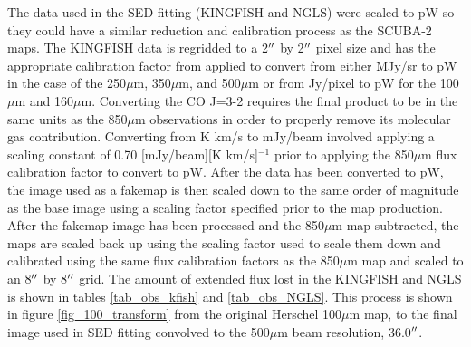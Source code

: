 The data used in the SED fitting (KINGFISH and NGLS) were scaled to pW so they could have a similar reduction and calibration process as the SCUBA-2 maps.   The KINGFISH data is regridded to a 2$\mbox{$^{\prime\prime}$}$ by 2$\mbox{$^{\prime\prime}$}$ pixel size and has the appropriate calibration factor from \cite{dempsey2013} applied to convert from either MJy/sr to pW in the case of the 250$\mu$m, 350$\mu$m, and 500$\mu$m or from Jy/pixel to pW for the 100$\mu$m and 160$\mu$m.  Converting the CO J=3-2 requires the final product to be in the same units as the 850$\mu$m observations in order to properly remove its molecular gas contribution.  Converting from K km/s to mJy/beam involved applying a scaling constant of 0.70 [mJy/beam][K km/s]$^{-1}$ \citep{drabek2012} prior to applying the 850$\mu$m flux calibration factor to convert to pW.  After the data has been converted to pW, the image used as a fakemap is then scaled down to the same order of magnitude as the base image using a scaling factor specified prior to the map production.  After the fakemap image has been processed and the 850$\mu$m map subtracted, the maps are scaled back up using the scaling factor used to scale them down and calibrated using the same flux calibration factors as the 850$\mu$m map and scaled to an 8$\mbox{$^{\prime\prime}$}$ by 8$\mbox{$^{\prime\prime}$}$ grid.  The amount of extended flux lost in the KINGFISH and NGLS is shown in tables \ref{tab_obs_kfish} and \ref{tab_obs_NGLS}.  This process is shown in figure \ref{fig_100_transform} from the original Herschel 100$\mu$m map, to the final image used in SED fitting convolved to the 500$\mu$m beam resolution, 36.0$\mbox{$^{\prime\prime}$}$.

